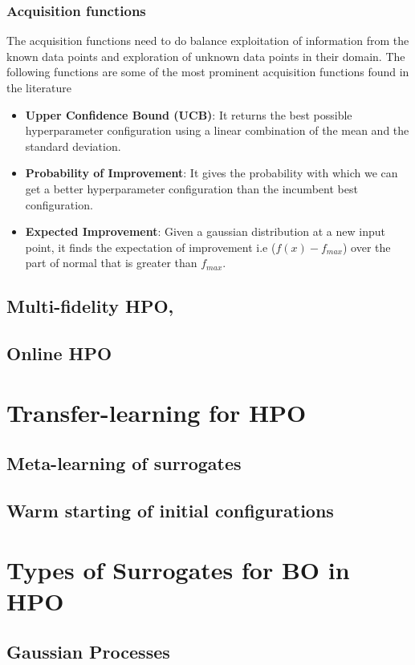 \documentclass[11pt]{report}
\begin{document}
\subsubsection{Acquisition functions}
The acquisition functions need to do balance exploitation of information from the known data points and exploration of unknown data points in their domain.
The following functions are some of the most prominent acquisition functions found in the literature~\cite{GPTutorial}
\begin{itemize}
\item \textbf{Upper Confidence Bound (UCB)}: It returns the best possible hyperparameter configuration using a linear combination of the mean and the standard deviation.
\item \textbf{Probability of Improvement}: It gives the probability with which we can get a better hyperparameter configuration than the incumbent best configuration.
\item \textbf{Expected Improvement}: Given a gaussian distribution at a new input point, it finds the expectation of improvement i.e ($f(x) - f_{max}$) over the part of normal that is greater than $f_{max}$.
\end{itemize}

\subsection{Multi-fidelity HPO,}
\subsection{Online HPO}


\section{Transfer-learning for HPO}
\subsection{Meta-learning of surrogates}
\subsection{Warm starting of initial configurations}

\section{Types of Surrogates for BO in HPO}
\subsection{Gaussian Processes}
\end{document}
